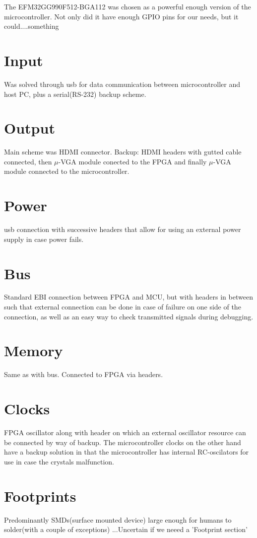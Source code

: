 The EFM32GG990F512-BGA112 was chosen as a powerful enough version of the microcontroller.
Not only did it have enough GPIO pins for our needs, but it could....something %

\section{Input}
Was solved through usb for data communication between microcontroller and host PC, plus a serial(RS-232) backup scheme.

\section{Output}
Main scheme was HDMI connector. Backup: HDMI headers with gutted cable connected, then $\mu$-VGA module conected to the FPGA and finally $\mu$-VGA module connected to the microcontroller.

\section{Power}
usb connection with successive headers that allow for using an external power supply in case power fails.

\section{Bus}
Standard EBI connection between FPGA and MCU, but with headers in between such that external connection can be done in case of failure on one side of the connection, as well as an easy way to check transmitted signals during debugging.

\section{Memory}
Same as with bus. Connected to FPGA via headers.
\section{Clocks}
FPGA oscillator along with header on which an external oscillator resource can be connected by way of backup.
The microcontroller clocks on the other hand have a backup solution in that the microcontroller has internal RC-oscilators for use in case the crystals malfunction.

\section{Footprints}
Predominantly SMDs(surface mounted device) large enough for humans to solder(with a couple of exceptions)
...Uncertain if we neeed a 'Footprint section'
